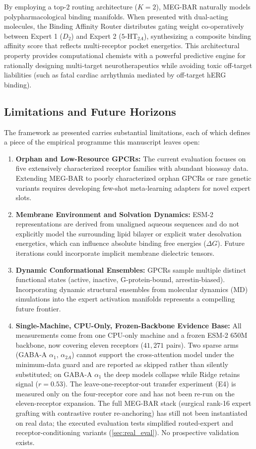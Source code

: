 \documentclass{article}
\theoremstyle{definition}
\begin{document}
By employing a top-$2$ routing architecture ($K=2$), MEG-BAR naturally models polypharmacological binding manifolds. When presented with dual-acting molecules, the Binding Affinity Router distributes gating weight co-operatively between Expert 1 ($D_2$) and Expert 2 ($5\text{-HT}_{2A}$), synthesizing a composite binding affinity score that reflects multi-receptor pocket energetics. This architectural property provides computational chemists with a powerful predictive engine for rationally designing multi-target neurotherapeutics while avoiding toxic off-target liabilities (such as fatal cardiac arrhythmia mediated by off-target hERG binding).

\subsection{Limitations and Future Horizons}
The framework as presented carries substantial limitations, each of which defines a piece of the empirical programme this manuscript leaves open:
\begin{enumerate}[leftmargin=1.5em,noitemsep]
    \item \textbf{Orphan and Low-Resource GPCRs:} The current evaluation focuses on five extensively characterized receptor families with abundant bioassay data. Extending MEG-BAR to poorly characterized orphan GPCRs or rare genetic variants requires developing few-shot meta-learning adapters for novel expert slots.
    \item \textbf{Membrane Environment and Solvation Dynamics:} ESM-2 representations are derived from unaligned aqueous sequences and do not explicitly model the surrounding lipid bilayer or explicit water desolvation energetics, which can influence absolute binding free energies ($\Delta G$). Future iterations could incorporate implicit membrane dielectric tensors.
    \item \textbf{Dynamic Conformational Ensembles:} GPCRs sample multiple distinct functional states (active, inactive, G-protein-bound, arrestin-biased). Incorporating dynamic structural ensembles from molecular dynamics (MD) simulations into the expert activation manifolds represents a compelling future frontier.
    \item \textbf{Single-Machine, CPU-Only, Frozen-Backbone Evidence Base:} All measurements come from one CPU-only machine and a frozen ESM-2 650M backbone, now covering eleven receptors ($41{,}271$ pairs). Two sparse arms (GABA-A $\alpha_1$, $\alpha_{2A}$) cannot support the cross-attention model under the minimum-data guard and are reported as skipped rather than silently substituted; on GABA-A $\alpha_1$ the deep models collapse while Ridge retains signal ($r = 0.53$). The leave-one-receptor-out transfer experiment (E4) is measured only on the four-receptor core and has not been re-run on the eleven-receptor expansion. The full MEG-BAR stack (surgical rank-16 expert grafting with contrastive router re-anchoring) has still not been instantiated on real data; the executed evaluation tests simplified routed-expert and receptor-conditioning variants (\cref{sec:real_eval}). No prospective validation exists.
\end{enumerate}
\end{document}
